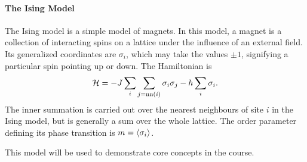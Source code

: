\paragraph{The Ising Model}
The Ising model is a simple model of magnets. In this model, a magnet is a collection of interacting spins on a lattice under the influence of an external field. Its generalized coordinates are $\sigma_{i}$, which may take the values $\pm 1$, signifying a particular spin pointing up or down. The Hamiltonian is
\begin{align*}
	\mathcal{H} = -J\sum\limits_{i}\sum\limits_{j = \text{nn}(i)}\sigma_{i}\sigma_{j} - h\sum\limits_{i}\sigma_{i}.
\end{align*}
The inner summation is carried out over the nearest neighbours of site $i$ in the Ising model, but is generally a sum over the whole lattice. The order parameter defining its phase transition is $m = \expval{\sigma_{i}}$.

This model will be used to demonstrate core concepts in the course.

